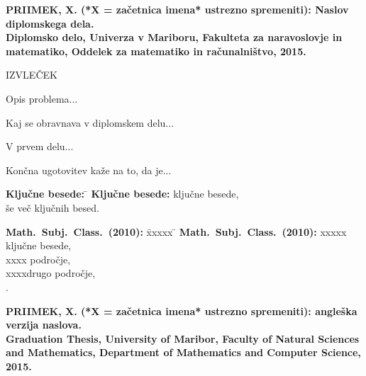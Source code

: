   \textbf{PRIIMEK, X. (*X = za\v cetnica imena* ustrezno spremeniti): Naslov diplomskega dela.\\
    Diplomsko delo, Univerza v Mariboru, Fakulteta za naravoslovje in \-ma\-te\-ma\-ti\-ko,
    Oddelek za matematiko in ra\v cunalni\v stvo, 2015.}\\

  \vspace{1.5cm}

  \large

  IZVLE\v CEK

  \small

  \vspace{1.5cm}
  \begin{sloppypar}
    Opis problema...
  \end{sloppypar}
  \begin{sloppypar}
    Kaj se obravnava v diplomskem delu...
  \end{sloppypar}
  \begin{sloppypar}
    V prvem delu...
  \end{sloppypar}
  \begin{sloppypar}
    Kon\v cna ugotovitev ka\v ze na to, da je...
  \end{sloppypar}

  \vfill

  \begin{tabbing}
    \textbf{Klju\v cne besede:} \=\kill
    \textbf{Klju\v cne besede:} \>klju\v cne besede,\\
    \>\v se ve\v c klju\v cnih besed.\\
  \end{tabbing}

  \begin{tabbing}
    \textbf{Math.\ Subj.\ Class.\ (2010):} \=xxxxx \=\kill
    \textbf{Math.\ Subj.\ Class.\ (2010):} \>xxxxx klju\v cne besede,\\
    \>xxxx podro\v cje,\\
    \>xxxxdrugo podro\v cje,\\\>.\\
  \end{tabbing}

  \newpage
  \textbf{PRIIMEK, X. (*X = za\v cetnica imena* ustrezno spremeniti): angle\v ska verzija naslova.\\
    Graduation Thesis, University of Maribor, Faculty of Natural Sciences and \-Ma\-the\-ma\-tics,
    Department of Mathematics and Computer Science, 2015.}\\


